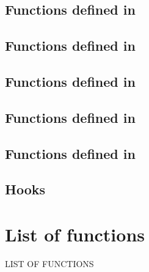 \documentclass[english,a4paper,11pt,oldtoc,mctitle]{rapport3}
\begin{document}
\section{Functions defined in }
\label{sec:queryref}


\section{Functions defined in }
\label{sec:menuref}


\section{Functions defined in }
\label{sec:dockref}


\section{Functions defined in }
\label{sec:spref}


\section{Functions defined in }
\label{sec:deref}


\section{Hooks}
\label{sec:hookref}


\appendix





\chapter*{List of functions}
%
         {\MakeUppercase{List of functions}}%

\makeatletter
\def\fnlisti#1{\@dottedtocline{1}{0em}{1.5em}{\lstinline!#1!}{\pageref{fn:#1}}}
{\parskip\z@}
\makeatother

\begin{htmlonly}
\newcommand{\fnlisti}[1]{\fnref{#1}\\}

\end{htmlonly}

\printindex
\end{document}
